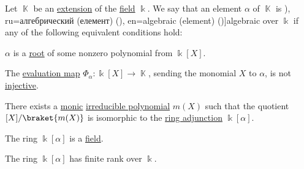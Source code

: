 \begin{definition}\label{def:algebraic_element}
  Let \( \BbbK \) be an \hyperref[def:field/submodel]{extension} of the \hyperref[def:field]{field} \( \Bbbk \). We say that an element \( \alpha \) of \( \BbbK \) is \term[bg=алгебричен (елемент) (\cite[422]{Обрешков1962ВисшаАлгебра}), ru=алгебрический (елемент) (\cite[407]{Винберг2014КурсАлгебры}), en=algebraic (element) (\cite[124]{Jacobson1985BasicAlgebraI})]{algebraic} over \( \Bbbk \) if any of the following equivalent conditions hold:
  \begin{thmenum}
     \( \alpha \) is a \hyperref[def:root_of_polynomial]{root} of some nonzero polynomial from \( \Bbbk[X] \).

    \mimprovised The \hyperref[con:evaluation_homomorphism]{evaluation map} \( \Phi_\alpha: \Bbbk[X] \to \BbbK \), sending the monomial \( X \) to \( \alpha \), is not \hyperref[def:function_invertibility/injective]{injective}.

     There exists a \hyperref[def:monic_polynomial]{monic} \hyperref[def:domain_divisibility/irreducible]{irreducible polynomial} \( m(X) \) such that the quotient \( \Bbbk[X] / \braket{ m(X) } \) is isomorphic to the \hyperref[def:semiring_adjunction]{ring adjunction} \( \Bbbk[\alpha] \).

    \mimprovised The ring \( \Bbbk[\alpha] \) is a \hyperref[def:field]{field}.

    \mimprovised The ring \( \Bbbk[\alpha] \) has finite rank over \( \Bbbk \).
  \end{thmenum}
\end{definition}
